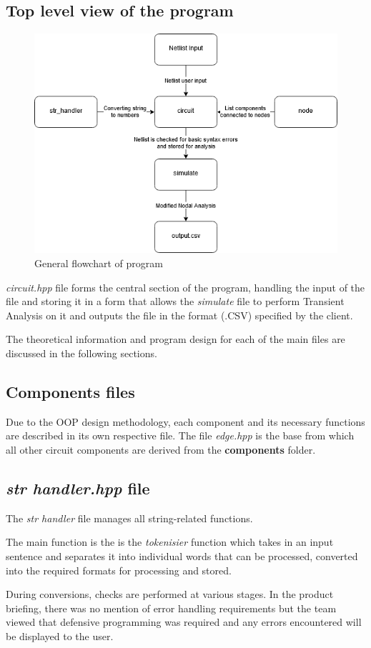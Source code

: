 \documentclass[12pt,a4paper]{article}
\begin{document}
	\subsection{Top level view of the program}
	\begin{figure} [h!]
		\centering
		\includegraphics[scale=0.5]{Flow chart.PNG}
		\caption{General flowchart of program}
	\end{figure}
	\textit{circuit.hpp} file forms the central section of the program, handling the input of the file and 
	storing it in a form that allows the \textit{simulate} file to perform Transient Analysis on it and outputs
	the file in the format (.CSV) specified by the client.
	\par
	The theoretical information and program design for each of the main files are discussed in the following 
	sections.
	\pagebreak
	\subsection{Components files}
	Due to the OOP design methodology, each component and its necessary functions are described in its own
	respective file. The file \textit{edge.hpp} is the base from which all other circuit components are derived
	from the \textbf{components} folder. 
	\subsection{\textit{str handler.hpp} file}
	The \textit{str handler} file manages all string-related functions. \par
	The main function is the is the \textit{tokenisier} function which takes in an 
	input sentence and separates it into individual words that can be processed, 
	converted into the required formats for processing and stored. \par
	During conversions, checks are performed at various stages. In the product briefing, there
	was no mention of error handling requirements but the team viewed that defensive programming 
	was required and any errors encountered will be displayed to the user. 
\end{document}
